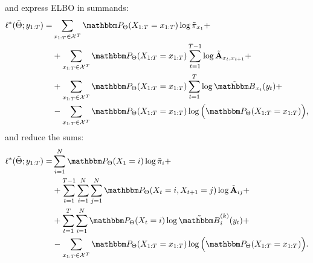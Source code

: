 \documentclass[shortabstract]{iithesis}
\begin{document}
\linebreak
and express ELBO in summands:
\begin{equation*}
    \begin{aligned}
         \ell^* (\Tilde{\Theta}; y_{1:T}) = & \sum_{x_{1:T} \in \mathcal X^T} \mathbbm P_{\Theta}(X_{1:T}=x_{1:T}) \log  \Tilde{\pi}_{x_1}  +\\ & +  \sum_{x_{1:T} \in \mathcal X^T} \mathbbm P_{\Theta}(X_{1:T}=x_{1:T}) \sum_{t=1}^{T-1}  \log \Tilde{\textbf{A}}_{x_t, x_{t+1}}  +\\ & +  \sum_{x_{1:T} \in \mathcal X^T} \mathbbm P_{\Theta}(X_{1:T}=x_{1:T}) \sum_{t=1}^T \log   \Tilde{\mathbbm B}_{x_t}(y_t)  +\\ & -  \sum_{x_{1:T} \in \mathcal X^T} \mathbbm P_{\Theta}(X_{1:T}=x_{1:T}) \log \Big(\mathbbm P_{\Theta}(X_{1:T}=x_{1:T}) \Big)\text{,}
    \end{aligned}
\end{equation*}
and reduce the sums:
\begin{equation*}
    \begin{aligned}
        \ell^* (\Tilde{\Theta}; y_{1:T}) = & \sum_{i=1}^N \mathbbm P_{\Theta}(X_{1}=i) \log  \Tilde{\pi}_{i}  +\\ 
        & +  \sum_{t=1}^{T-1} \sum_{i=1}^N  \sum_{j=1}^N \mathbbm P_{\Theta}(X_{t}=i, X_{t+1}=j) \log  \Tilde{\textbf{A}}_{ij}  +\\ 
        & +  \sum_{t=1}^T \sum_{i=1}^N \mathbbm P_{\Theta}(X_{t}=i) \log   \Tilde{\mathbbm B}_{i}^{(k)}(y_t)  +\\ 
        & -  \sum_{x_{1:T} \in \mathcal X^T} \mathbbm P_{\Theta}(X_{1:T}=x_{1:T}) \log \Big(\mathbbm P_{\Theta}(X_{1:T}=x_{1:T}) \Big)\text{.}
    \end{aligned}
\end{equation*}



\end{document}
